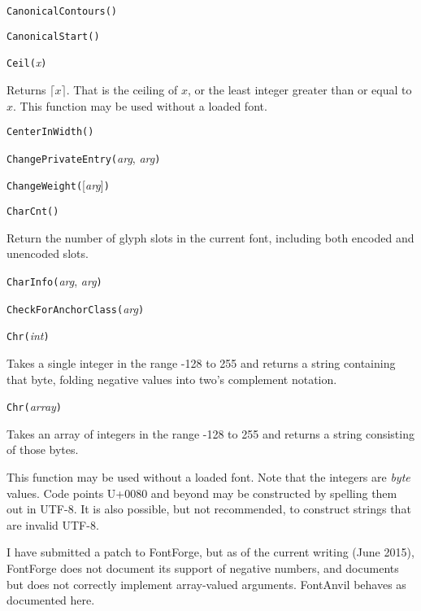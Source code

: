 \noindent\texttt{CanonicalContours(}\texttt{)}


\noindent\texttt{CanonicalStart(}\texttt{)}


\noindent\texttt{Ceil(}\textit{x}\texttt{)}

Returns $\lceil x \rceil$.  That is the ceiling of $x$, or the least
integer greater than or equal to $x$.  This function may be used without a
loaded font.


\noindent\texttt{CenterInWidth(}\texttt{)}


\noindent\texttt{ChangePrivateEntry(}\textit{arg}, \textit{arg}\texttt{)}


\noindent\texttt{ChangeWeight(}[\textit{arg}]\texttt{)}


\noindent\texttt{CharCnt()}

Return the number of glyph slots in the current font, including both encoded
and unencoded slots.


\noindent\texttt{CharInfo(}\textit{arg}, \textit{arg}\texttt{)}


\noindent\texttt{CheckForAnchorClass(}\textit{arg}\texttt{)}


\noindent\texttt{Chr(}\textit{int}\texttt{)}

Takes a single integer in the range -128 to 255 and returns a string
containing that byte, folding negative values into two's complement
notation.

\noindent\texttt{Chr(}\textit{array}\texttt{)}

Takes an array of integers in the range -128 to 255 and returns a string
consisting of those bytes.

This function may be used without a loaded font.  Note that the integers are
\emph{byte} values.  Code points U+0080 and beyond may be constructed by
spelling them out in UTF-8.  It is also possible, but not recommended, to
construct strings that are invalid UTF-8.

I have submitted a patch to FontForge, but as of the current writing (June
2015), FontForge does not document its support of negative numbers, and
documents but does not correctly implement array-valued
arguments.  FontAnvil behaves as documented here.

